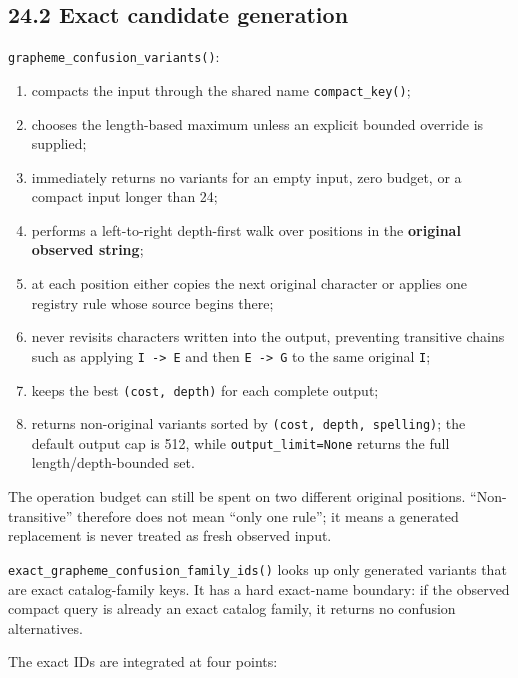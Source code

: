 \subsection{24.2 Exact candidate generation}\label{242-exact-candidate-generation}

\texttt{grapheme\_\allowbreak{}confusion\_\allowbreak{}variants()}:

\begin{enumerate}
\def\labelenumi{\arabic{enumi}.}
\tightlist
\item
  compacts the input through the shared name \texttt{compact\_\allowbreak{}key()};
\item
  chooses the length-based maximum unless an explicit bounded override is supplied;
\item
  immediately returns no variants for an empty input, zero budget, or a compact input longer than 24;
\item
  performs a left-to-right depth-first walk over positions in the \textbf{original observed string};
\item
  at each position either copies the next original character or applies one registry rule whose source begins there;
\item
  never revisits characters written into the output, preventing transitive chains such as applying \texttt{I\ -\textgreater{}\ E} and then \texttt{E\ -\textgreater{}\ G} to the same original \texttt{I};
\item
  keeps the best \texttt{(cost,\ depth)} for each complete output;
\item
  returns non-original variants sorted by \texttt{(cost,\ depth,\ spelling)}; the default output cap is 512, while \texttt{output\_\allowbreak{}limit=None} returns the full length/depth-bounded set.
\end{enumerate}

The operation budget can still be spent on two different original positions. ``Non-transitive'' therefore does not mean ``only one rule''; it means a generated replacement is never treated as fresh observed input.

\texttt{exact\_\allowbreak{}grapheme\_\allowbreak{}confusion\_\allowbreak{}family\_\allowbreak{}ids()} looks up only generated variants that are exact catalog-family keys. It has a hard exact-name boundary: if the observed compact query is already an exact catalog family, it returns no confusion alternatives.

The exact IDs are integrated at four points:

